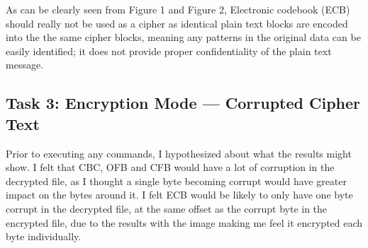 			As can be clearly seen from Figure 1 and Figure 2, Electronic codebook (ECB) should really not be used as a cipher as identical plain text blocks are encoded into the the same cipher blocks, meaning any patterns in the original data can be easily identified; it does not provide proper confidentiality of the plain text message.
	\pagebreak
	
	\subsection{Task 3: Encryption Mode — Corrupted Cipher Text}
		
		Prior to executing any commands, I hypothesized about what the results might show. I felt that CBC, OFB and CFB would have a lot of corruption in the decrypted file, as I thought a single byte becoming corrupt would have greater impact on the bytes around it. 
		I felt ECB would be likely to only have one byte corrupt in the decrypted file, at the same offset as the corrupt byte in the encrypted file, due to the results with the image making me feel it encrypted each byte individually.
		
